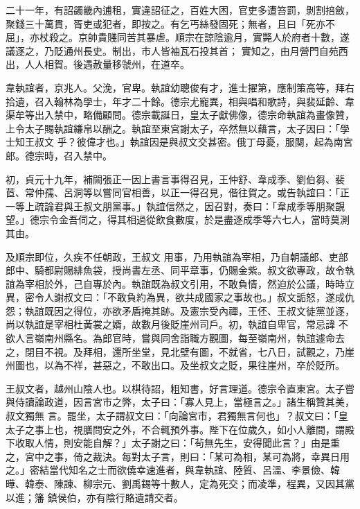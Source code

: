 \begin{pinyinscope}
 二十一年，有詔蠲畿內逋租，實違詔征之，百姓大困，官吏多遭笞罰，剝割掊斂，聚錢三十萬貫，胥吏或犯者，即按之。有乞丐絲發固死；無者，且曰「死亦不屈」，亦杖殺之。京帥貴賤同苦其暴虐。順宗在諒陰逾月，實斃人於府者十數，遂議逐之，乃貶通州長史。制出，市人皆袖瓦石投其首；
 實知之，由月營門自苑西出，人人相賀。後遇赦量移虢州，在道卒。



 韋執誼者，京兆人。父浼，官卑。執誼幼聰俊有才，進士擢第，應制策高等，拜右拾遺，召入翰林為學士，年才二十餘。德宗尤寵異，相與唱和歌詩，與裴延齡、韋渠牟等出入禁中，略備顧問。德宗載誕日，皇太子獻佛像，德宗命執誼為畫像贊，上令太子賜執誼縑帛以酬之。執誼至東宮謝太子，卒然無以藉言，太子因曰：「學士知王叔文
 乎？彼偉才也。」執誼因是與叔文交甚密。俄丁母憂，服闋，起為南宮郎。德宗時，召入禁中。



 初，貞元十九年，補闕張正一因上書言事得召見，王仲舒、韋成季、劉伯芻、裴茝、常仲孺、呂洞等以嘗同官相善，以正一得召見，偕往賀之。或告執誼曰：「正一等上疏論君與王叔文朋黨事。」執誼信然之，因召對，奏曰：「韋成季等朋聚覬望。」德宗令金吾伺之，得其相過從飲食數度，於是盡逐成季等六七人，當時莫測其由。



 及順宗即位，久疾不任朝政，王叔文
 用事，乃用執誼為宰相，乃自朝議郎、吏部郎中、騎都尉賜緋魚袋，授尚書左丞、同平章事，仍賜金紫。叔文欲專政，故令執誼為宰相於外，己自專於內。執誼既為叔文引用，不敢負情，然迫於公議，時時立異，密令人謝叔文曰：「不敢負約為異，欲共成國家之事故也。」叔文詬怒，遂成仇怨；執誼既因之得位，亦欲矛盾掩其跡。及憲宗受內禪，王伾、王叔文徒黨並逐，尚以執誼是宰相杜黃裳之婿，故數月後貶崖州司戶。初，執誼自卑官，常忌諱
 不欲人言嶺南州縣名。為郎官時，嘗與同舍詣職方觀圖，每至嶺南州，執誼遽命去之，閉目不視。及拜相，還所坐堂，見北壁有圖，不就省，七八日，試觀之，乃崖州圖也，以為不祥，甚惡之，不敢出口。及坐叔文之貶，果往崖州，卒於貶所。



 王叔文者，越州山陰人也。以棋待詔，粗知書，好言理道。德宗令直東宮。太子嘗與侍讀論政道，因言宮市之弊，太子曰：「寡人見上，當極言之。」諸生稱贊其美，叔文獨無
 言。罷坐，太子謂叔文曰：「向論宮市，君獨無言何也」？叔文曰：「皇太子之事上也，視膳問安之外，不合輒預外事。陛下在位歲久，如小人離間，謂殿下收取人情，則安能自解？」太子謝之曰：「茍無先生，安得聞此言？」由是重之，宮中之事，倚之裁決。每對太子言，則曰：「某可為相，某可為將，幸異日用之。」密結當代知名之士而欲僥幸速進者，與韋執誼、陸質、呂溫、李景儉、韓曄、韓泰、陳諫、柳宗元、劉禹錫等十數人，定為死交；而凌準，程異，又因其黨以進；籓
 鎮侯伯，亦有陰行賂遺請交者。




\end{pinyinscope}
